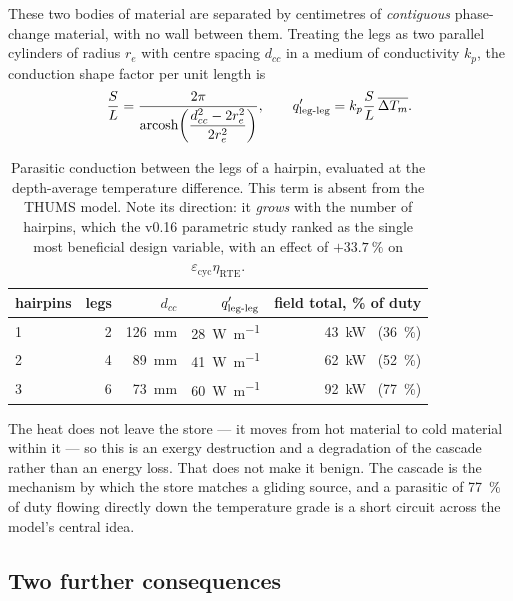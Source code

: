 These two bodies of material are separated by centimetres of \emph{contiguous}
phase-change material, with no wall between them. Treating the legs as two
parallel cylinders of radius $r_e$ with centre spacing $d_{cc}$ in a medium of
conductivity $k_p$, the conduction shape factor per unit length is
\begin{equation}
\frac{S}{L} = \frac{2\pi}{\operatorname{arcosh}
  \!\left(\dfrac{d_{cc}^{2} - 2r_e^{2}}{2r_e^{2}}\right)},
\qquad
q'_{\text{leg-leg}} = k_p \frac{S}{L}\, \overline{\Delta T_{m}}.
\end{equation}

\begin{table}[h]
\centering
\begin{tabular}{lrrrr}
\toprule
hairpins & legs & $d_{cc}$ & $q'_{\text{leg-leg}}$ & field total, \% of duty \\
\midrule
1 & 2 & \SI{126}{\milli\metre} & \SI{28}{\watt\per\metre} & \SI{43}{\kilo\watt} \ (\SI{36}{\percent}) \\
2 & 4 & \SI{89}{\milli\metre}  & \SI{41}{\watt\per\metre} & \SI{62}{\kilo\watt} \ (\SI{52}{\percent}) \\
3 & 6 & \SI{73}{\milli\metre}  & \SI{60}{\watt\per\metre} & \SI{92}{\kilo\watt} \ (\SI{77}{\percent}) \\
\bottomrule
\end{tabular}
\caption{Parasitic conduction between the legs of a hairpin, evaluated at the
depth-average temperature difference. This term is absent from the THUMS
model. Note its direction: it \emph{grows} with the number of hairpins, which
the v0.16 parametric study ranked as the single most beneficial design
variable, with an effect of $+\SI{33.7}{\percent}$ on
$\varepsilon_{\mathrm{cyc}}\eta_{\mathrm{RTE}}$.}
\label{tab:shortcircuit}
\end{table}

The heat does not leave the store --- it moves from hot material to cold
material within it --- so this is an exergy destruction and a degradation of
the cascade rather than an energy loss. That does not make it benign. The
cascade is the mechanism by which the store matches a gliding source, and a
parasitic of \SI{77}{\percent} of duty flowing directly down the temperature
grade is a short circuit across the model's central idea.

\subsection{Two further consequences}

